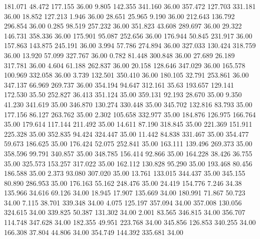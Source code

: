  181.071   48.472  177.155        36.00
   9.805  142.355  341.160        36.00
 357.472  127.703  331.181        36.00
  18.852  127.213    1.946        36.00
  28.651   25.965    9.190        36.00
 212.643  136.792  296.854        36.00
   0.285   98.519  257.232        36.00
 351.823   43.608  289.697        36.00
  29.322  146.731  358.336        36.00
 175.901   95.087  252.656        36.00
 176.944   50.845  231.917        36.00
 157.863  143.875  245.191        36.00
   3.994   57.786  274.894        36.00
 327.033  130.424  318.759        36.00
  13.920   57.099  327.767        36.00
   0.782   81.448  300.848        36.00
  27.689   26.189  317.781        36.00
   4.604   61.188  262.837        36.00
  20.158  128.646  347.029        36.00
 165.578  100.969  332.058        36.00
   3.739  132.501  350.410        36.00
 180.105   32.791  253.861        36.00
 347.137   66.969  269.737        36.00
 354.194   94.647  312.161        35.63
 193.657  129.141  172.530        35.50
 252.827   36.413  351.124        35.00
 359.131   92.193   28.670        35.00
   9.350   41.230  341.619        35.00
 346.870  130.274  330.448        35.00
 345.702  132.816   83.793        35.00
 177.156   86.127  263.762        35.00
   2.302  105.658  332.977        35.00
 184.876  126.975  166.764        35.00
 179.614  117.144  211.492        35.00
  14.611   87.190  318.845        35.00
 221.369  151.911  225.328        35.00
 352.835   94.424  324.447        35.00
  11.442   84.838  331.467        35.00
 354.477   59.673  186.625        35.00
 176.424   52.075  252.841        35.00
 163.111  139.496  269.373        35.00
 358.596   99.791  340.857        35.00
 348.785  156.414   92.866        35.00
 164.228   38.426   36.755        35.00
 325.573  153.257  317.022        35.00
 162.112  130.828   95.290        35.00
 193.468   80.456  186.588        35.00
   2.373   93.080  307.020        35.00
  13.761  133.015  344.437        35.00
 345.155   80.890  286.953        35.00
 176.163   55.162  248.476        35.00
  24.419  154.776    7.246        34.38
 135.966   34.616   69.126        34.00
  18.945   17.907  135.669        34.00
 180.991   71.867   50.723        34.00
   7.115   38.701  339.348        34.00
   4.075  125.197  357.094        34.00
 357.008  130.056  324.615        34.00
 339.825   50.387  131.302        34.00
   2.001   83.565  346.815        34.00
 356.707  114.748  347.628        34.00
 182.355   49.951  223.768        34.00
 345.856  126.853  340.255        34.00
 166.308   37.804   44.806        34.00
 354.749  144.392  335.681        34.00
